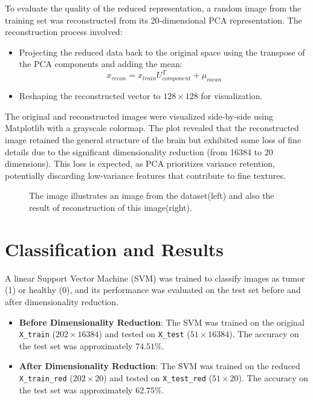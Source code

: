 \documentclass{article}
\begin{document}
To evaluate the quality of the reduced representation, a random image from the training set was reconstructed from its 20-dimensional PCA representation. The reconstruction process involved:

\begin{itemize}
    \item Projecting the reduced data back to the original space using the transpose of the PCA components and adding the mean: 
    \begin{equation*}
        x_{\textit{recon}} = x_{\textit{train}} U_{\textit{component}}^T + \mu_{\textit{mean}}
    \end{equation*}
    \item Reshaping the reconstructed vector to $128 \times 128$ for visualization.
\end{itemize}

The original and reconstructed images were visualized side-by-side using Matplotlib with a grayscale colormap. The plot revealed that the reconstructed image retained the general structure of the brain but exhibited some loss of fine details due to the significant dimensionality reduction (from 16384 to 20 dimensions). This loss is expected, as PCA prioritizes variance retention, potentially discarding low-variance features that contribute to fine textures.

\begin{figure}[h]
    \caption{The image illustrates an image from the dataset(left) and also the result of reconstruction of this image(right).}
\end{figure}


\section*{Classification and Results}

A linear Support Vector Machine (SVM) was trained to classify images as tumor (1) or healthy (0), and its performance was evaluated on the test set before and after dimensionality reduction.

\begin{itemize}
    \item \textbf{Before Dimensionality Reduction}: The SVM was trained on the original \texttt{X\_train} ($202 \times 16384$) and tested on \texttt{X\_test} ($51 \times 16384$). The accuracy on the test set was approximately $74.51\%$.
    \item \textbf{After Dimensionality Reduction}: The SVM was trained on the reduced \texttt{X\_train\_red} ($202 \times 20$) and tested on \texttt{X\_test\_red} ($51 \times 20$). The accuracy on the test set was approximately $62.75\%$.
\end{itemize}
\end{document}
